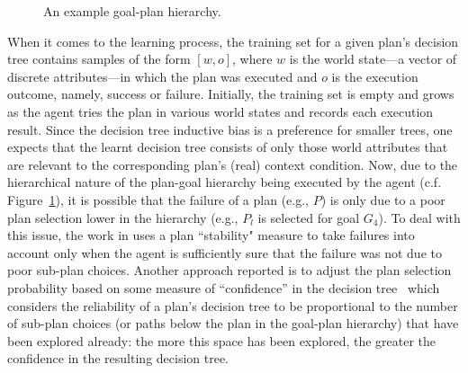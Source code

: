 \begin{figure}[t]
\begin{center}

\end{center}
\caption{An example goal-plan hierarchy.}
\label{fig:confidence}
\end{figure}

When it comes to the learning process, the training set for a given plan's decision tree contains samples of the form $[w, o]$, where $w$ is the world state---a vector of discrete attributes---in which the plan was executed and $o$ is the execution outcome, namely, success or failure. Initially, the training set is empty and grows as the agent tries the plan in various world states and records each execution result. 
Since the decision tree inductive bias is a preference for smaller trees, one expects that the learnt decision tree consists of only those world attributes that are relevant to the corresponding plan's (real) context condition.
Now, due to the hierarchical nature of the plan-goal hierarchy being executed by the agent (c.f. Figure~\ref{fig:confidence}), it is possible that the failure of a plan (e.g., $P$) is only due to a poor plan selection lower in the hierarchy (e.g., $P_l$ is selected for goal $G_4$).
To deal with this issue, the work in \cite{airiau09:enhancing} uses a plan ``stability" measure to take failures into account only when the agent is sufficiently sure that the failure was not due to poor sub-plan choices. Another approach reported is to adjust the plan selection probability based on some measure of ``confidence'' in the decision tree~\cite{singh10:extending,singh10:learning} which considers the reliability of a plan's decision tree to be proportional to the number of sub-plan choices (or paths below the plan in the goal-plan hierarchy) that have been explored already: the more this space has been explored, the greater the confidence in the resulting decision tree. 

